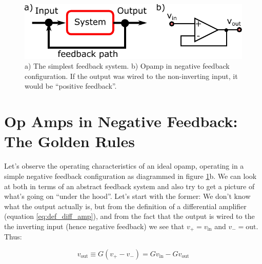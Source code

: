 \documentclass{tufte-book}
\begin{document}
\begin{figure}[ht]
\caption{a) The simplest feedback system. b) Opamp in negative feedback configuration. If the output was wired to the non-inverting input, it would be ``positive feedback''.}
\label{fig:simple_feedback}
\begin{center}
\includegraphics[]{Images/simple_feedback.pdf}
\end{center}
\end{figure}

\section{Op Amps in Negative Feedback: The Golden Rules}
Let's observe the operating characteristics of an ideal opamp, operating in a simple negative feedback configuration as diagrammed in figure \ref{fig:simple_feedback}b. We can look at both in terms of an abstract feedback system and also try to get a picture of what's going on ``under the hood''. Let's start with the former: We don't know what the output actually is, but from the definition of a differential amplifier (equation \ref{eq:def_diff_amp}), and from the fact that the output is wired to the the inverting input (hence negative feedback) we see that $v_+ = v_\text{in}$ and $v_-=\text{out}$. Thus:

\begin{equation*}
v_\text{out} \equiv G\left(v_+ - v_-\right)  = Gv_\text{in} - Gv_\text{out}
\end{equation*}
\end{document}
